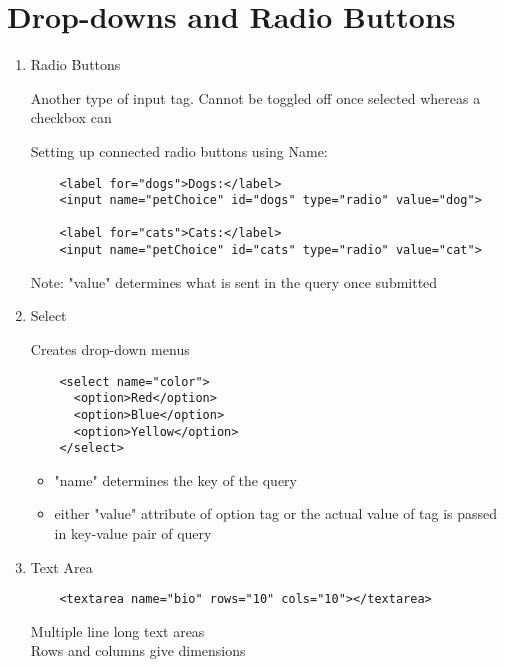 \documentclass{article}
\begin{document}
\section{Drop-downs and Radio Buttons}
\begin{enumerate}
	\item Radio Buttons
	
	Another type of input tag. Cannot be toggled off once selected whereas a checkbox can
	\begin{center}
		Setting up connected radio buttons using Name:
	\end{center}
	\begin{verbatim}
	<label for="dogs">Dogs:</label>
	<input name="petChoice" id="dogs" type="radio" value="dog">
	
	<label for="cats">Cats:</label>
	<input name="petChoice" id="cats" type="radio" value="cat">
	\end{verbatim}
	Note: "value" determines what is sent in the query once submitted
	\item Select
	
	Creates drop-down menus
	\begin{verbatim}
	<select name="color">
	  <option>Red</option>
	  <option>Blue</option>
	  <option>Yellow</option>
	</select>
	\end{verbatim}
	\begin{itemize}
		\item "name" determines the key of the query
		\item either "value" attribute of option tag or the actual value of tag is passed in key-value pair of query
	\end{itemize}

	\item Text Area
	\begin{verbatim}
	<textarea name="bio" rows="10" cols="10"></textarea>
	\end{verbatim}
	
	Multiple line long text areas\\Rows and columns give dimensions
	
	\begin{verbatim}
	
	\end{verbatim}
\end{enumerate}
\end{document}
